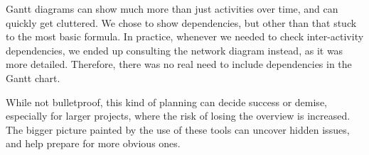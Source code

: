 Gantt diagrams can show much more than just activities over time, and can quickly
get cluttered\cite[ch.~8.6]{caye}. We chose to show dependencies, but other than
that stuck to the most basic formula. In practice, whenever we needed to
check inter-activity dependencies, we ended up consulting the network diagram
instead, as it was more detailed. Therefore, there was no real need to include
dependencies in the Gantt chart.

While not bulletproof, this kind of planning can decide success or
demise\cite[ch.~8]{caye}, especially for larger projects, where the risk of
losing the overview is increased. The bigger picture painted by the use of
these tools can uncover hidden issues, and help prepare for more obvious ones.
